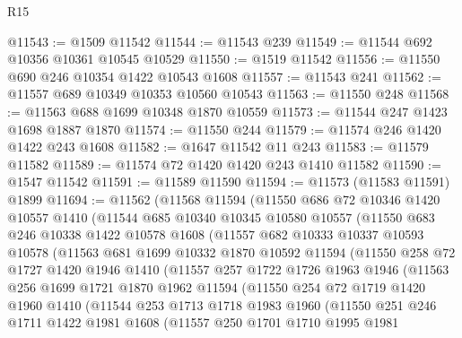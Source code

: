 \begin{lexlean}{R15}
\begin{coremodule}
@11543 := @1509 @11542
@11544 := @11543 @239
@11549 := @11544 @692 @10356 @10361 @10545 @10529
@11550 := @1519 @11542
@11556 := @11550 @690 @246 @10354 @1422 @10543 @1608
@11557 := @11543 @241
@11562 := @11557 @689 @10349 @10353 @10560 @10543
@11563 := @11550 @248
@11568 := @11563 @688 @1699 @10348 @1870 @10559
@11573 := @11544 @247 @1423 @1698 @1887 @1870
@11574 := @11550 @244
@11579 := @11574 @246 @1420 @1422 @243 @1608
@11582 := @1647 @11542 @11 @243
@11583 := @11579 @11582
@11589 := @11574 @72 @1420 @1420 @243 @1410 @11582
@11590 := @1547 @11542
@11591 := @11589 @11590
@11594 := @11573 (@11583 @11591) @1899
@11694 := @11562
    (@11568
      @11594
      (@11550
        @686
        @72
        @10346
        @1420
        @10557
        @1410
        (@11544
          @685
          @10340
          @10345
          @10580
          @10557
          (@11550
            @683
            @246
            @10338
            @1422
            @10578
            @1608
            (@11557
              @682
              @10333
              @10337
              @10593
              @10578
              (@11563
                @681
                @1699
                @10332
                @1870
                @10592
                @11594
                (@11550
                  @258
                  @72
                  @1727
                  @1420
                  @1946
                  @1410
                  (@11557
                    @257
                    @1722
                    @1726
                    @1963
                    @1946
                    (@11563
                      @256
                      @1699
                      @1721
                      @1870
                      @1962
                      @11594
                      (@11550
                        @254
                        @72
                        @1719
                        @1420
                        @1960
                        @1410
                        (@11544
                          @253
                          @1713
                          @1718
                          @1983
                          @1960
                          (@11550
                            @251
                            @246
                            @1711
                            @1422
                            @1981
                            @1608
                            (@11557
                              @250
                              @1701
                              @1710
                              @1995
                              @1981

\end{coremodule}
\end{lexlean}

